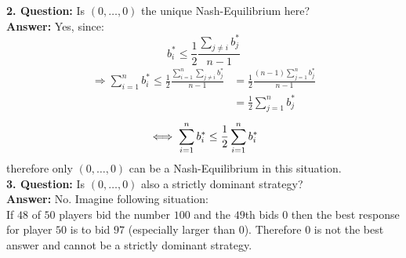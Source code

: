 \begin{example}
	\textbf{2. Question:} Is $(0, \dotsc, 0)$ the unique Nash-Equilibrium here? \\
	\textbf{Answer:} Yes, since:	
	\[ b_{i}^{*} \leq \frac{1}{2} \frac{\sum_{j \neq i} b_{j}^{*}}{n - 1} \]
	\begin{align*}
		\Rightarrow \sum_{i = 1}^{n} b_{i}^{*} \leq \frac{1}{2} \frac{\sum_{i = 1}^{n} \sum_{j \neq i} b_{j}^{*}}{n - 1} & = \frac{1}{2} \frac{(n - 1) \sum_{j = 1}^{n} b_{j}^{*}}{n - 1} \\
		& = \frac{1}{2} \sum_{j = 1}^{n} b_{j}^{*}
	\end{align*} 
	\[ \iff \sum_{i = 1}^{n} b_{i}^{*} \leq \frac{1}{2} \sum_{i = 1}^{n} b_{i}^{*} \]
	therefore only $(0, \dotsc,  0)$ can be a Nash-Equilibrium in this situation. \\


	\textbf{3. Question:} Is $(0, \dotsc, 0)$ also a strictly dominant strategy? \\
	\textbf{Answer:} No. Imagine following situation: \\
	If $48$ of $50$ players bid the number $100$ and the $49$th bids $0$ then the best response for player $50$ is to bid $97$ (especially larger than 0). Therefore $0$ is not the best answer and cannot be a strictly dominant strategy.
\end{example}

\newpage
